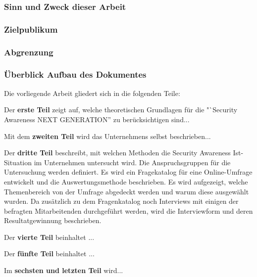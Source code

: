 \documentclass[../../main.tex]{subfiles}
\begin{document}

\subsubsection*{Sinn und Zweck dieser Arbeit}

\subsubsection*{Zielpublikum}

\subsubsection*{Abgrenzung}

\subsubsection*{Überblick Aufbau des Dokumentes}

Die vorliegende Arbeit gliedert sich in die folgenden Teile:

\begin{sloppypar}
Der \textbf{erste Teil} zeigt auf, welche theoretischen Grundlagen für die "`Security Awareness NEXT GENERATION'' zu berücksichtigen sind...
\end{sloppypar}

\begin{sloppypar}
Mit dem \textbf{zweiten Teil} wird das Unternehmens selbst beschrieben...
\end{sloppypar}

\begin{sloppypar}
Der \textbf{dritte Teil} beschreibt, mit welchen Methoden die Security Awareness Ist-Situation im Unternehmen untersucht wird. Die Anspruchsgruppen für die Untersuchung werden definiert. Es wird ein Fragekatalog für eine Online-Umfrage entwickelt und die Auswertungsmethode beschrieben. Es wird aufgezeigt, welche Themenbereich von der Umfrage abgedeckt werden und warum diese ausgewählt wurden. Da zusätzlich zu dem Fragenkatalog noch Interviews mit einigen der befragten Mitarbeitenden durchgeführt werden, wird die Interviewform und deren Resultatgewinnung beschrieben.
\end{sloppypar}

\begin{sloppypar}
Der \textbf{vierte Teil} beinhaltet ...
\end{sloppypar}

\begin{sloppypar}
Der \textbf{fünfte Teil} beinhaltet ...
\end{sloppypar}


\begin{sloppypar}
Im \textbf{sechsten und letzten Teil} wird...

\end{sloppypar}
\end{document}
